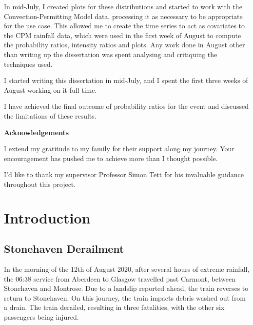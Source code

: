 \documentclass[12pt,a4paper,openany]{report}
\begin{document}
In mid-July, I created plots for these distributions and started to work with the Convection-Permitting Model data,
    processing it as necessary to be appropriate for the use case.
This allowed me to create the time series to act as covariates to the CPM rainfall data,
    which were used in the first week of August to compute the probability ratios, intensity ratios and plots.
Any work done in August other than writing up the dissertation was spent analysing and critiquing the techniques used.

I started writing this dissertation in mid-July, and I spent the first
three weeks of August working on it full-time.

I have achieved the final outcome of probability ratios for the event and
    discussed the limitations of these results.


\newpage

\begin{center}
\textbf{Acknowledgements}
\end{center}

I extend my gratitude to my family for their support along my journey.
Your encouragement has pushed me to achieve more than I thought possible.

I'd like to thank my supervisor Professor Simon Tett for his invaluable guidance throughout this project.


\newpage
\tableofcontents
\newpage
\listoftables
\newpage
\listoffigures


\chapter{Introduction}\label{ch:intro}

\section{Stonehaven Derailment}\label{sec:stonederail}

In the morning of the 12th of August 2020,
    after several hours of extreme rainfall,
    the 06:38 service from Aberdeen to Glasgow travelled past Carmont,
    between Stonehaven and Montrose.
Due to a landslip reported ahead,
    the train reverses to return to Stonehaven.
On this journey,
    the train impacts debris washed out from a drain.
The train derailed,
    resulting in three fatalities,
    with the other six passengers being injured.
\end{document}
